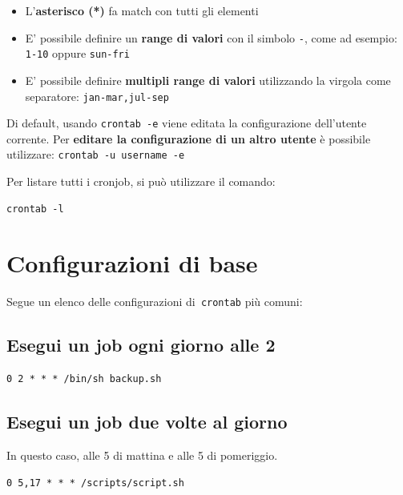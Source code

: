 \documentclass[a4paper]{report}
\newenvironment{info}{\begin{tcolorbox}[fonttitle=\sffamily\bfseries\large,title=Info,colframe=blue!75!white]}{\end{tcolorbox}}
\newenvironment{code}{\begin{tcolorbox}[size=small]}{\end{tcolorbox}}
\begin{document}
\begin{itemize}
	\item L'\textbf{asterisco (*)} fa match con tutti gli elementi
	\item E' possibile definire un\textbf{ range di valori} con il simbolo \texttt{-}, come ad esempio: \texttt{1-10} oppure \texttt{sun-fri}
	\item E' possibile definire \textbf{multipli range di valori} utilizzando la virgola come separatore: \texttt{jan-mar,jul-sep}
\end{itemize}

\begin{info}
	Di default, usando \texttt{crontab -e} viene editata la configurazione dell'utente corrente. Per \textbf{editare la configurazione di un altro utente} è possibile utilizzare:
	\texttt{crontab -u username -e}
\end{info}

Per listare tutti i cronjob, si può utilizzare il comando:
\begin{code}
\begin{lstlisting}
crontab -l
\end{lstlisting}
\end{code}


\section {Configurazioni di base}

Segue un elenco delle configurazioni di\texttt{ crontab} più comuni:

\subsection{Esegui un job ogni giorno alle 2}
\begin{code}
\begin{lstlisting}
0 2 * * * /bin/sh backup.sh
\end{lstlisting}
\end{code}

\subsection{Esegui un job due volte al giorno}
In questo caso, alle 5 di mattina e alle 5 di pomeriggio.
\begin{code}
\begin{lstlisting}
0 5,17 * * * /scripts/script.sh
\end{lstlisting}
\end{code}
\end{document}
